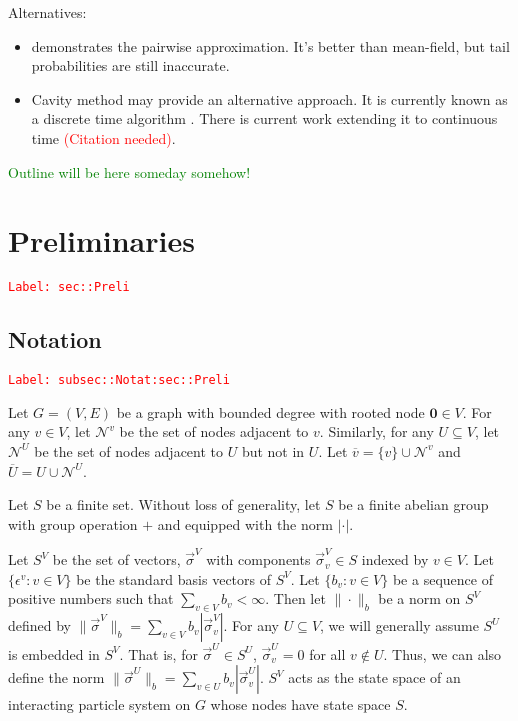 \documentclass[12pt]{article}
\newcommand{\mc}{\mathcal}
\newcommand{\ov}{\overline}
\newcommand{\ep}{\epsilon}
\newcommand{\tr}{\textcolor{red}}
\newcommand{\tg}{\textcolor{green}}
\newcommand{\labe}[1]{\tr{\texttt{Label: #1}}}
\newcommand{\ind}{\hspace{24pt}}
\renewcommand{\root}{\mathbf{0}}				%
\renewcommand{\v}{v}							%
\renewcommand{\U}{U}							%
\renewcommand{\S}{S}							%
\newcommand{\s}{\sigma}							%
\newcommand{\sv}{\vec{\s}}						%
\renewcommand{\b}{b}							%
\newcommand{\ev}{\ep}							%
\newcommand{\neigh}{\mc{N}}						%
\newcommand{\vind}[1]{^{#1}}					%
\newcommand{\carp}[1]{^{#1}}					%
\newcommand{\vsi}[1]{^{#1}}						%
\newcommand{\cind}[1]{_{#1}}					%
\newcommand{\cl}{\ov}							%
\begin{document}
Alternatives:

\begin{itemize}
\item \cite{Gas15} demonstrates the pairwise approximation. It's better than mean-field, but tail probabilities are still inaccurate.

\item Cavity method may provide an alternative approach. It is currently known as a discrete time algorithm \cite{Lac15}\cite{KanMon11}. There is current work extending it to continuous time \tr{(Citation needed)}.
\end{itemize}

\tg{Outline will be here someday somehow!}


\section{Preliminaries}
\label{sec::Preli}\labe{sec::Preli}

\subsection{Notation}
\label{subsec::Notat:sec::Preli}\labe{subsec::Notat:sec::Preli}

Let \(G = (V,E)\) be a graph with bounded degree with rooted node \(\root \in V\). For any \(\v \in V\), let \(\neigh\vind{\v}\) be the set of nodes adjacent to \(\v\). Similarly, for any \(\U \subseteq V\), let \(\neigh\vind{\U}\) be the set of nodes adjacent to \(\U\) but not in \(\U\). Let \(\cl{\v} = \{\v\}\cup\neigh\vind{\v}\) and \(\cl{\U} = \U\cup \neigh\vind{\U}\). 

\ind Let \(\S\) be a finite set. Without loss of generality, let \(\S\) be a finite abelian group with group operation \(+\) and equipped with the norm \(|\cdot|\). 

\ind Let \(\S\carp{V}\) be the set of vectors, \(\sv\cind{}\vsi{V}\) with components \(\sv\cind{\v}\vsi{V} \in \S\) indexed by \(\v\in V\). Let \(\{\ev\vind{\v}: \v\in V\}\) be the standard basis vectors of \(\S\carp{V}\). Let \(\{\b\cind{\v}:\v\in V\}\) be a sequence of positive numbers such that \(\sum_{\v\in V} \b\cind{\v} < \infty\). Then let \(\|\cdot\|_{\b}\) be a norm on \(\S\carp{V}\) defined by \(\|\sv\cind{}\vsi{V}\|_{\b} = \sum_{\v\in V} \b\cind{\v}|\sv\cind{\v}\vsi{V}|\). For any \(\U\subseteq V\), we will generally assume \(\S\carp{\U}\) is embedded in \(\S\carp{V}\). That is, for \(\sv\cind{}\vsi{\U}\in \S\carp{\U}\), \(\sv\cind{\v}\vsi{\U} = 0\) for all \(\v\notin\U\). Thus, we can also define the norm \(\|\sv\cind{}\vsi{\U}\|_{\b} = \sum_{\v\in\U} \b\cind{\v}|\sv\cind{\v}\vsi{\U}|\). \(\S\carp{V}\) acts as the state space of an interacting particle system on \(G\) whose nodes have state space \(\S\).
\end{document}
